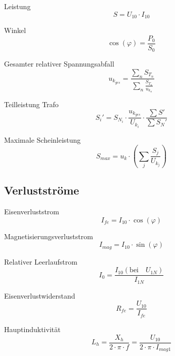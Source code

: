 \documentclass[11pt, a4paper, final, fleqn, twocolumn]{article}
\numberwithin{equation}{subsection}
\begin{document}
\noindent Leistung
\begin{equation}
    S = U_{10} \cdot I_{10}
\end{equation}

\noindent Winkel
\begin{equation}
    \cos(\varphi) = \frac{P_{0}}{S_{0}}
\end{equation}

\noindent Gesamter relativer Spannungsabfall
\begin{equation}
    u_{k_{ges}} = \frac{\sum_n S_{T_{n}}}{\sum_n \frac{S_{T_{n}}}{u_{k_{n}}}}
\end{equation}

\noindent Teilleistung Trafo
\begin{equation}
    S_i' = S_{N_{i}} \cdot \frac{u_{k_{ges}}}{U_{k_{i}}} \cdot \frac{\sum S'}{\sum S_N'}
\end{equation}

\noindent Maximale Scheinleistung
\begin{equation}
    S_{max} = u_k \cdot \left(\sum_j \frac{S_j}{U_{k_{j}}} \right)
\end{equation}


\subsection{Verlustströme}

Eisenverluststrom
\begin{equation}
    I_{fe} = I_{10} \cdot \cos(\varphi)
\end{equation}

\noindent Magnetisierungsverluststrom
\begin{equation}
    I_{mag} = I_{10} \cdot \sin(\varphi)
\end{equation}

\noindent Relativer Leerlaufstrom
\begin{equation}
    I_0 = \frac{I_{10} (\text{bei} \quad U_{1N})}{I_{1N}}
\end{equation}

\noindent Eisenverlustwiderstand
\begin{equation}
    R_{fe} = \frac{U_{10}}{I_{fe}}
\end{equation}

\noindent Hauptinduktivität
\begin{equation}
    L_h = \frac{X_h}{2 \cdot \pi \cdot f} = \frac{U_{10}}{2 \cdot \pi \cdot I_{mag1}}
\end{equation}
\end{document}
